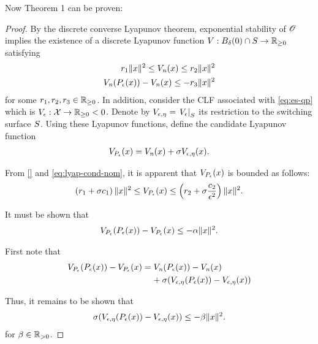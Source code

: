 \documentclass[twocolumn]{article}
\begin{document}
Now Theorem 1 can be proven:
\begin{proof}
  By the discrete converse Lyapunov theorem, exponential stability of $\Orbit$ implies the existence of a discrete Lyapunov function $\V : B_{\delta}(0) \cap \S \to \Rnn$ satisfying
  \begin{align}
    \nonumber
    r_{1} \| x \|^{2} \leq \Vn(x) \leq r_{2} \| x \|^2\\
    \Vn(\Pe(x)) - \Vn(x) \leq -r_{3} \| x \|^{2}
    \label{eq:lyap-cond-nom}
  \end{align}
for some $r_{1}, r_{2}, r_{3} \in \Rnn$.
%
In addition, consider the CLF associated with \eqref{eq:es-qp} which is $\Ve : \X \to \Rnn < 0$.
%
Denote by $\Vee = \VeS$ its restriction to the switching surface $\S$.
%
Using these Lyapunov functions, define the candidate Lyapunov function
\begin{align}
  \VP(x) = \Vn(x) + \sigma \Vee(x).
\end{align}

From \eqref{} and \eqref{eq:lyap-cond-nom}, it is apparent that $\VP(x)$ is bounded as follows:
\begin{align}
  \left( r_{1} + \sigma c_{1} \right) \| x \|^{2} \leq \VP(x) \leq \left( r_{2} + \sigma \frac{c_{2}}{\epsilon^{2}}  \right) \| x \|^{2}.
\end{align}

It must be shown that
\begin{align}
  \VP(\Pe(x)) - \VP(x) \leq -\alpha \| x \|^{2}.
\end{align}

First note that
\begin{align}
  \VP(\Pe(x)) - \VP(x) = \Vn(\Pe(x)) - \Vn(x) \hspace{1.2cm}\\
  \nonumber
  \mbox{} + \sigma(\Vee(\Pe(x)) - \Vee(x))
\end{align}

Thus, it remains to be shown that
\begin{align}
  \sigma(\Vee(\Pe(x)) - \Vee(x)) \leq -\beta \| x \|^{2}.
\end{align}
for $\beta \in \Rpd$.

\end{proof}
\end{document}
